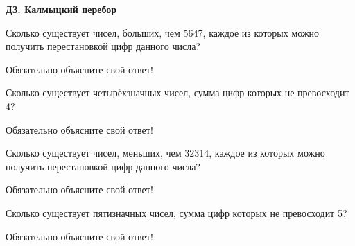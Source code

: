 \centerline{\bf \Huge ДЗ. Калмыцкий перебор}
\centerline{\bf \Huge }

 Сколько существует чисел, больших, чем 5647, каждое из которых можно получить перестановкой цифр данного числа?

Обязательно объясните свой ответ!

 Сколько существует четырёхзначных чисел, сумма цифр которых не превосходит 4?

Обязательно объясните свой ответ!

 Сколько существует чисел, меньших, чем 32314, каждое из которых можно получить перестановкой цифр данного числа?

Обязательно объясните свой ответ!

 Сколько существует пятизначных чисел, сумма цифр которых не превосходит 5?

Обязательно объясните свой ответ!